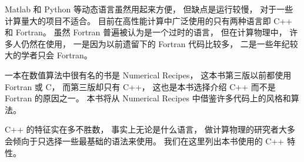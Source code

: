 
Matlab 和 Python 等动态语言虽然用起来方便， 但缺点是运行较慢， 对于一些计算量大的项目不适合。 目前在高性能计算中广泛使用的只有两种语言即 C++ 和 Fortran。 虽然 Fortran 普遍被认为是一个过时的语言， 但在计算物理中， 许多人仍然在使用， 一是因为以前遗留下的 Fortran 代码比较多， 二是一些年纪较大的学者只会 Fortran。

一本在数值算法中很有名的书是 Numerical Recipes， 这本书第三版以前都使用 Fortran 或 C， 而第三版却只有 C++， 这也是本书选择介绍 C++ 而不是 Fortran 的原因之一。 本书将从 Numerical Recipes 中借鉴许多代码上的风格和算法。

C++ 的特征实在多不胜数， 事实上无论是什么语言， 做计算物理的研究者大多会倾向于只选择一些最基础的语法来使用。
我们在这里列出本书使用的 C++ 特性。


